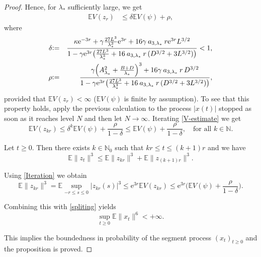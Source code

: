 \documentclass[11pt,reqno,draft]{amsart}
\begin{document}
\begin{proof}
\noindent Hence, for $\lambda_{\ast}$ sufficiently large, we get
\begin{equation}\label{V-estimate}
\begin{split}
{\mathbb E} V(z_r)&\leq \delta {\mathbb E} V(\psi)+\rho,
\end{split}
\end{equation}
where
\begin{eqnarray*}
\delta&{\mathrel{\mathrm{\raise0.1ex\hbox{:}\hbox{=}\strut}}}&\frac{\kappa
{\mathrm{e}}^{-3r}+\gamma\frac{27L^3}{\lambda_{\ast}^3}{\mathrm{e}}^{3r}+16\gamma\:a_{3,\lambda_{\ast}}\:
r{\mathrm{e}}^{3r}L^{3/2}}{1-\gamma {\mathrm{e}}^{3r}\big(\frac{27L^3}{\lambda_{\ast}^3}+16\:a_{3,\lambda_{\ast}}\:
r\,(D^{3/2}+3L^{3/2})\big)}<1,\\
\rho&{\mathrel{\mathrm{\raise0.1ex\hbox{:}\hbox{=}\strut}}}&\frac{\gamma
\Big(A_{\lambda_{\ast}}^2+\frac{B+D}{\lambda_{\ast}}\Big)^3+16\gamma\:a_{3,\lambda_{\ast}}\:
r\,D^{3/2}}{1-\gamma {\mathrm{e}}^{3r}\big(\frac{27L^3}{\lambda_{\ast}^3}+16\:a_{3,\lambda_{\ast}}\:
r\,(D^{3/2}+3L^{3/2})\big)},
\end{eqnarray*}
provided that ${\mathbb E} V(z_r)<\infty$ (${\mathbb E} V(\psi)$ is finite by assumption). To see that this property holds,
apply the previous calculation to the process $|x(t)|$ stopped as soon as it reaches level $N$ and then
let $N \to \infty$.
Iterating \eqref{V-estimate} we get
\begin{equation}\label{Iteration}
{\mathbb E} V(z_{kr})\leq \delta^k{\mathbb E} V(\psi)+\frac{\rho}{1-\delta}\leq {\mathbb E}
V(\psi)+\frac{\rho}{1-\delta},\quad\mbox{for all $k\in{\mathbb{N}}$}.
\end{equation}

\noindent Let $t\geq 0$. Then there exists $k\in{\mathbb{N}}_0$ such that
$kr\leq t\leq (k+1)r$ and we have
\begin{equation} \label{spliting}
{\mathbb E}\|z_t\|^3\leq {\mathbb E}\|z_{kr}\|^3+{\mathbb E}\|z_{(k+1)r}\|^3.
\end{equation}

\noindent Using \eqref{Iteration} we obtain
$$
{\mathbb E}\|z_{kr}\|^3={\mathbb E}\sup\limits_{-r\leq s\leq 0}|z_{kr}(s)|^3\leq
{\mathrm{e}}^{3r}{\mathbb E} V(z_{kr})\leq {\mathrm{e}}^{3r} \Big({\mathbb E}
V(\psi)+\frac{\rho}{1-\delta}\Big).
$$

\noindent Combining this with \eqref{spliting} yields
\begin{equation}\label{moment-estimate}
\sup\limits_{t\geq 0}{\mathbb E}\|x_t\|^6<+\infty.
\end{equation}

\noindent This implies the boundedness in probability of the segment
process $(x_t)_{t\geq 0}$ and the proposition is proved.
\end{proof}
\end{document}
